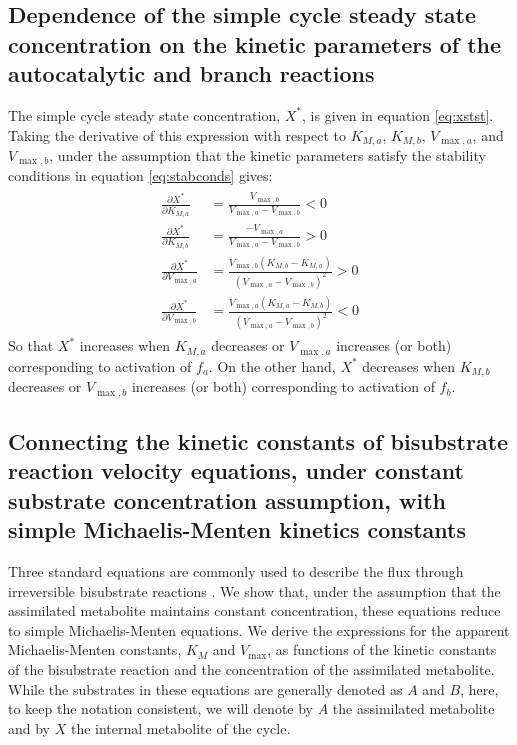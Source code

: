   \subsection{Dependence of the simple cycle steady state concentration on the kinetic parameters of the autocatalytic and branch reactions}
  The simple cycle steady state concentration, $X^*$, is given in equation \ref{eq:xstst}.
  Taking the derivative of this expression with respect to $K_{M,a}$, $K_{M,b}$, $V_{\max,a}$, and $V_{\max,b}$, under the assumption that the kinetic parameters satisfy the stability conditions in equation \ref{eq:stabconds} gives:
  \begin{align}
      \begin{split}
          \label{eq:ststdep}
    \frac{\partial X^*}{\partial K_{M,a}}&=\frac{V_{\max,b}}{V_{\max,a}-V_{\max,b}}<0 \\
    \frac{\partial X^*}{\partial K_{M,b}}&=\frac{-V_{\max,a}}{V_{\max,a}-V_{\max,b}}>0 \\
    \frac{\partial X^*}{\partial V_{\max,a}}&=\frac{V_{\max,b}(K_{M,b}-K_{M,a})}{(V_{\max,a}-V_{\max,b})^2}>0 \\
    \frac{\partial X^*}{\partial V_{\max,b}}&=\frac{V_{\max,a}(K_{M,a}-K_{M,b})}{(V_{\max,a}-V_{\max,b})^2}<0
      \end{split}
  \end{align}
  So that $X^*$ increases when $K_{M,a}$ decreases or $V_{\max,a}$ increases (or both) corresponding to activation of $f_a$.
  On the other hand, $X^*$ decreases when $K_{M,b}$ decreases or $V_{\max,b}$ increases (or both) corresponding to activation of $f_b$.

  \subsection{Connecting the kinetic constants of bisubstrate reaction velocity equations, under constant substrate concentration assumption, with simple Michaelis-Menten kinetics constants}
  Three standard equations are commonly used to describe the flux through irreversible bisubstrate reactions \cite{Leskovac2003-li}.
  We show that, under the assumption that the assimilated metabolite maintains constant concentration, these equations reduce to simple Michaelis-Menten equations.
  We derive the expressions for the apparent Michaelis-Menten constants, $K_M$ and $V_{\max}$, as functions of the kinetic constants of the bisubstrate reaction and the concentration of the assimilated metabolite.
  While the substrates in these equations are generally denoted as $A$ and $B$, here, to keep the notation consistent, we will denote by $A$ the assimilated metabolite and by $X$ the internal metabolite of the cycle.

